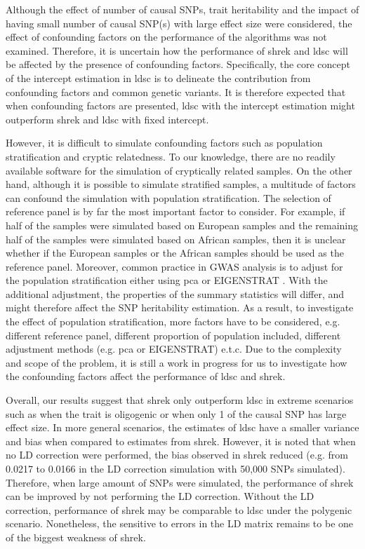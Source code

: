 	Although the effect of number of causal \glspl{SNP}, trait heritability and the impact of having small number of causal \gls{SNP}(s) with large effect size were considered, the effect of confounding factors on the performance of the algorithms was not examined.
	Therefore, it is uncertain how the performance of \gls{shrek} and \gls{ldsc} will be affected by the presence of confounding factors.
	Specifically, the core concept of the intercept estimation in \gls{ldsc} is to delineate the contribution from confounding factors and common genetic variants.
	It is therefore expected that when confounding factors are presented, \gls{ldsc} with the intercept estimation might outperform \gls{shrek} and \gls{ldsc} with fixed intercept.
	
	However, it is difficult to simulate confounding factors such as population stratification and cryptic relatedness.
	To our knowledge, there are no readily available software for the simulation of cryptically related samples.
	On the other hand, although it is possible to simulate stratified samples, a multitude of factors can confound the simulation with population stratification.
	The selection of reference panel is by far the most important factor to consider. 
	For example, if half of the samples were simulated based on European samples and the remaining half of the samples were simulated based on African samples, then it is unclear whether if the European samples or the African samples should be used as the reference panel.
	Moreover, common practice in \gls{GWAS} analysis is to adjust for the population stratification either using \gls{pca} or EIGENSTRAT \citep{Price2006}.
	With the additional adjustment, the properties of the summary statistics will differ, and might therefore affect the \gls{SNP} heritability estimation.
	As a result, to investigate the effect of population stratification, more factors have to be considered, e.g. different reference panel, different proportion of population included, different adjustment methods (e.g. \gls{pca} or EIGENSTRAT) e.t.c.
	Due to the complexity and scope of the problem, it is still a work in progress for us to investigate how the confounding factors affect the performance of \gls{ldsc} and \gls{shrek}.
		
	Overall, our results suggest that \gls{shrek} only outperform \gls{ldsc} in extreme scenarios such as when the trait is oligogenic or when only 1 of the causal \gls{SNP} has large effect size.
	In more general scenarios, the estimates of \gls{ldsc} have a smaller variance and bias when compared to estimates from \gls{shrek}.
	However, it is noted that when no \gls{LD} correction were performed, the bias observed in \gls{shrek} reduced (e.g. from 0.0217 to 0.0166 in the \gls{LD} correction simulation with 50,000 \glspl{SNP} simulated).
	Therefore, when large amount of \glspl{SNP} were simulated, the performance of \gls{shrek} can be improved by not performing the \gls{LD} correction.
	Without the \gls{LD} correction, performance of \gls{shrek} may be comparable to \gls{ldsc} under the polygenic scenario.
	Nonetheless, the sensitive to errors in the \gls{LD} matrix remains to be one of the biggest weakness of \gls{shrek}.
	
